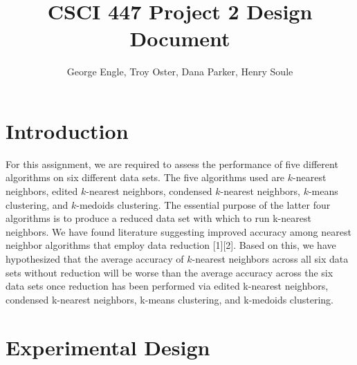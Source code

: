 \documentclass{article}
\title{CSCI 447 Project 2 Design Document}
\author{George Engle, Troy Oster, Dana Parker, Henry Soule}
\begin{document}
\maketitle
\section{Introduction}
For this assignment, we are required to assess the performance of five different algorithms on six different data sets. The five algorithms used are $k$-nearest neighbors, edited $k$-nearest neighbors, condensed $k$-nearest neighbors, $k$-means clustering, and $k$-medoids clustering.  The essential purpose of the latter four algorithms is to produce a reduced data set with which to run k-nearest neighbors. We have found literature suggesting improved accuracy among nearest neighbor algorithms that employ data reduction [1][2].  Based on this, we have hypothesized that the average accuracy of $k$-nearest neighbors across all six data sets without reduction will be worse than the average accuracy across the six data sets once reduction has been performed via edited k-nearest neighbors, condensed k-nearest neighbors, k-means clustering, and k-medoids clustering.
\section{Experimental Design}

\begin{center}
\end{center}
\end{document}

